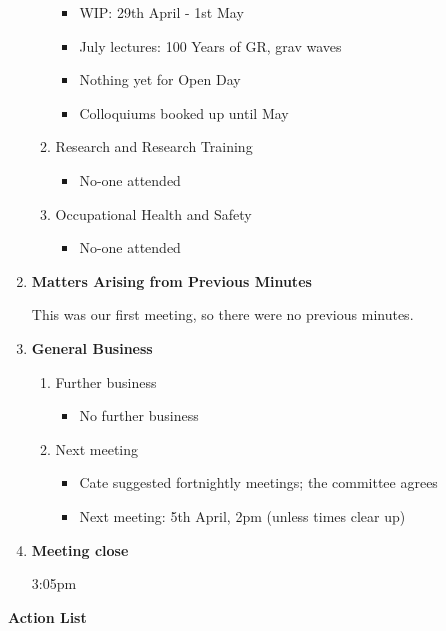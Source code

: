 \documentclass[a4paper,12pt]{article}
\newcommand{\itemi}[1]{\bf\large #1}
\begin{document}
\begin{enumerate}
\begin{enumerate}
\begin{itemize}
	\item WIP: 29th April - 1st May	
	
	\item July lectures: 100 Years of GR, grav waves
	
	\item Nothing yet for Open Day
	
	\item Colloquiums booked up until May	
	
	\end{itemize}
	
	\item Research and Research Training

	\begin{itemize}
	
	\item No-one attended	
	
	\end{itemize}
	
	\item Occupational Health and Safety

			\begin{itemize}
	
	\item No-one attended	
	
	\end{itemize}
	
	
	\end{enumerate}
\item {\itemi Matters Arising from Previous Minutes}

This was our first meeting, so there were no previous minutes.
\item {\itemi General Business}
	\begin{enumerate}
	\item Further business
	\begin{itemize}
	\item No further business
	\end{itemize}
	\item Next meeting
	
	\begin{itemize}
	
	\item Cate suggested fortnightly meetings; the committee agrees
	
	\item Next meeting: 5th April, 2pm (unless times clear up)	
	
	\end{itemize}
	
	\end{enumerate}
\item {\itemi Meeting close}

	3:05pm
\end{enumerate}
\pagebreak
{\Large \textbf{Action List}}
\end{document}
